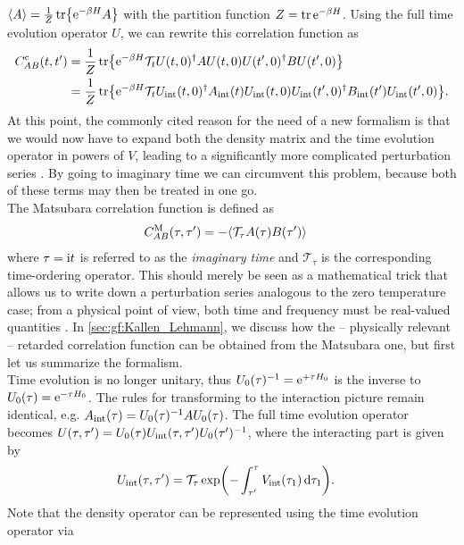 $
\bra*{A} = \frac{1}{Z} \tr \klc*{ \powe{-\beta H} A}
$
with the partition function $Z=\tr \text{e}^{-\beta H}$.
Using the full time evolution operator $U$, we can rewrite this correlation function as \cite[]{QMB_Bruus_2004}
\begin{align*}
C^\c_{AB}(t,t') &= \frac{1}{Z} \tr \klc*{ \powe{-\beta H} \mathcal{T}_t U(t,0)^\dagger A U(t,0) U(t',0)^\dagger B U(t',0)} \\
&= \frac{1}{Z} \tr \klc*{ \powe{-\beta H} \mathcal{T}_t U_\tint(t,0)^\dagger A_\tint(t) U_\tint(t,0) U_\tint(t',0)^\dagger B_\tint(t') U_\tint(t',0)}.
\end{align*}
At this point, the commonly cited reason for the need of a new formalism is that we would now have to expand both the density matrix and the time evolution operator in powers of $V$, leading to a significantly more complicated perturbation series \cites[]{QMB_Mahan_2000}. %
By going to imaginary time we can circumvent this problem, because both of these terms may then be treated in one go.\\
The Matsubara correlation function is defined as
\begin{align}
C^\M_{AB}(\tau,\tau') &= -\bra*{\mathcal{T}_\tau A(\tau) B(\tau')}
\end{align}
where $\tau=\text{i} t$ is referred to as the \emph{imaginary time} and $\mathcal{T}_\tau$ is the corresponding time-ordering operator.
This should merely be seen as a mathematical trick that allows us to write down a perturbation series analogous to the zero temperature case; from a physical point of view, both time and frequency must be real-valued quantities \cite[]{QMB_Bruus_2004}.
In \autoref{sec:gf:Kallen_Lehmann}, we discuss how the -- physically relevant -- retarded correlation function can be obtained from the Matsubara one, but first let us summarize the formalism.\\
Time evolution is no longer unitary, thus $U_0(\tau)^{-1} = \text{e}^{+\tau H_0}$ is the inverse to $U_0(\tau)=\text{e}^{-\tau H_0}$.
The rules for transforming to the interaction picture remain identical, e.g. $A_{\text{int}}(\tau) = U_0(\tau)^{-1} A U_0(\tau)$.
The full time evolution operator becomes $U(\tau,\tau') = U_0(\tau) U_{\text{int}}(\tau,\tau') U_0(\tau')^{-1}$, where the interacting part is given by
\begin{align*}
U_\tint(\tau,\tau') &= \mathcal{T}_\tau \exp \kla*{- \intx{\tau'}{\tau}{V_\tint(\tau_1)}{\tau_1}}.
\end{align*}
Note that the density operator can be represented using the time evolution operator via
